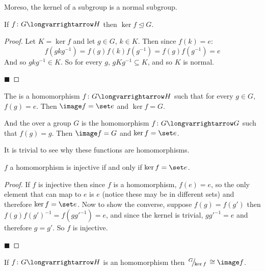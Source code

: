 \documentclass[10pt]{article}
\def\slfrac#1#2{\left.{}^{#1}\mkern-4mu\middle/\mkern-3mu{}_{#2}\right.}
\let\normalsub=\trianglelefteq
\begin{document}
Moreso, the kernel of a subgroup is a normal subgroup.

\begin{prop*}

    If $f\colon G\longvarrightarrow H$ then $\ker f\normalsub G$.

\end{prop*}

\begin{proof}

    Let $K=\ker f$ and let $g\in G$, $k\in K$.
    Then since $f(k)=e$:
    \[ f(gkg^{-1}) = f(g)f(k)f(g^{-1})=f(g)f(g^{-1}) = e \]
    And so $gkg^{-1}\in K$.
    So for every $g$, $gKg^{-1}\subseteq K$, and so $K$ is normal.

    \hfill$\blacksquare$

\end{proof}

\begin{exam}

    The  is a homomorphism $f\colon G\longvarrightarrow H$ such that for every $g\in G$, $f(g)=e$.
    Then $\image f=\set e$ and $\ker f = G$.

    And the  over a group $G$ is the homomorphism $f\colon G\longvarrightarrow G$ such that $f(g)=g$.
    Then $\image f=G$ and $\ker f = \set e$.

    It is trivial to see why these functions are homomorphisms.

\end{exam}

\begin{lemm*}

    $f$ a homomorphism is injective if and only if $\ker f=\set e$.

\end{lemm*}

\begin{proof}

    If $f$ is injective then since $f$ is a homomorphism, $f(e)=e$, so the only element that can map to $e$ is $e$ (notice these may be in different sets) and therefore $\ker f=\set e$.
    Now to show the converse, suppose $f(g)=f(g')$ then $f(g)f(g')^{-1}=f(gg'^{-1})=e$, and since the kernel is trivial, $gg'^{-1}=e$ and therefore $g=g'$.
    So $f$ is injective.

    \hfill$\blacksquare$

\end{proof}

\begin{thrm*}

    If $f\colon G\longvarrightarrow H$ is an homomorphism then $\slfrac G{\ker f}\cong\image f$.

\end{thrm*}
\end{document}
